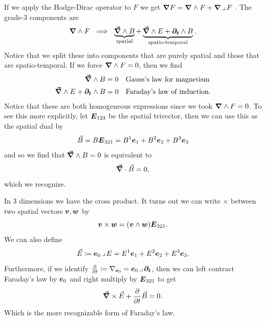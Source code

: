 \documentclass{article}
\begin{document}
If we apply the Hodge-Dirac operator to $F$ we get $\boldsymbol{\nabla} F = \boldsymbol{\nabla} \wedge F + \boldsymbol{\nabla} \hspace*{.5mm}\lrcorner \hspace*{.5mm} F$ . The grade-3 components are
\begin{align}
\label{eq:gauss_faraday}
	\boldsymbol{\nabla} \wedge F ~\implies~ \underbrace{\boldsymbol{\vec{\nabla}} \wedge B}_{\textrm{spatial}} + \underbrace{\boldsymbol{\vec{\nabla}} \wedge E + \boldsymbol{\partial_t} \wedge B}_{\textrm{spatio-temporal}}.
\end{align}
Notice that we split these into components that are purely spatial and those that are spatio-temporal. If we force $\boldsymbol{\nabla} \wedge F=0$, then we find
\begin{align}
    \boldsymbol{\vec{\nabla}} \wedge B &= 0 &&\textrm{Gauss's law for magnetism}\\
    \boldsymbol{\vec{\nabla}} \wedge E + \boldsymbol{\partial_t} \wedge B &= 0 &&\textrm{Faraday's law of induction.}
\end{align}
Notice that these are both homogeneous expressions since we took $\boldsymbol{\nabla} \wedge F=0$. To see this more explicitly, let $\boldsymbol{E}_{123}$ be the spatial trivector, then we can use this as the spatial dual by 
\begin{equation}
    \vec{B}=B\boldsymbol{E}_{321}= B^1\boldsymbol{e}_1+B^2\boldsymbol{e}_2+B^3\boldsymbol{e}_3
\end{equation}
and so we find that $\boldsymbol{\vec{\nabla}} \wedge B=0$ is equivalent to
\begin{equation}
    \boldsymbol{\vec{\nabla}} \cdot \vec{B}=0,
\end{equation}
which we recognize.

In 3 dimensions we have the cross product. It turns out we can write $\times$ between two spatial vectors $\boldsymbol{v},\boldsymbol{w}$ by
\begin{equation}
    \boldsymbol{v}\times \boldsymbol{w} = (\boldsymbol{v}\wedge \boldsymbol{w})\boldsymbol{E}_{321}.
\end{equation}
We can also define
\begin{equation}
    \vec{E}\coloneqq \boldsymbol{e}_0 \hspace*{.5mm}\lrcorner \hspace*{.5mm} E = E^1 \boldsymbol{e}_1 + E^2 \boldsymbol{e}_2 + E^3 \boldsymbol{e}_3.
\end{equation}
Furthermore, if we identify $\frac{\partial}{\partial t}\coloneqq \nabla_{\boldsymbol{e}_0}=\boldsymbol{e}_0 \hspace*{.5mm}\lrcorner \hspace*{.5mm} \boldsymbol{\partial_t}$, then we can left contract Faraday's law by $\boldsymbol{e}_0$ and right multiply by $\boldsymbol{E}_{321}$ to get
\begin{equation}
    \boldsymbol{\vec{\nabla}} \times \vec{E} + \frac{\partial}{\partial t} \vec{B} = 0.
\end{equation}
Which is the more recognizable form of Faraday's law.
\end{document}
